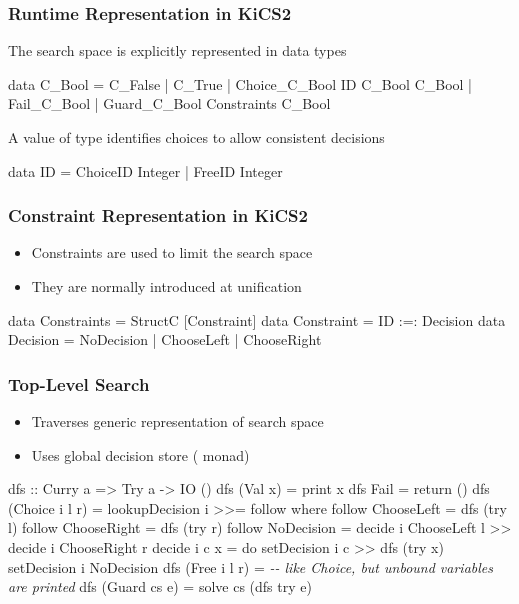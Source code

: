 \documentclass[
,hyperref={pdfpagelabels=false}
,xcolor=dvipsnames
]{beamer}
\newcommand{\comment}[1]{\textsl{-{}- #1}}
\begin{document}
\begin{frame}[fragile]%
\frametitle{Runtime Representation in KiCS2}

The search space is explicitly represented in data types
\begin{haskell}
data C_Bool
  = C_False
  | C_True
  | Choice_C_Bool ID C_Bool C_Bool
  | Fail_C_Bool
  | Guard_C_Bool Constraints C_Bool
\end{haskell}

A value of type  identifies choices to allow consistent decisions
\begin{haskell}
data ID = ChoiceID Integer
        | FreeID Integer
\end{haskell}
\end{frame}

\begin{frame}[fragile]%
\frametitle{Constraint Representation in KiCS2}

\begin{itemize}
\item Constraints are used to limit the search space
\item They are normally introduced at unification
\end{itemize}

\begin{haskell}
data Constraints = StructC [Constraint] \medskip
data Constraint = ID :=: Decision \medskip
data Decision = NoDecision
              | ChooseLeft
              | ChooseRight
\end{haskell}
\end{frame}

\begin{frame}[fragile]%
\frametitle{Top-Level Search}

\begin{itemize}
  \item Traverses generic representation of search space
  \item Uses global decision store ( monad)
\end{itemize}

\begin{haskell}
dfs :: Curry a => Try a -> IO ()
dfs (Val x)        = print x
dfs Fail           = return ()
dfs (Choice i l r) = lookupDecision i >>= follow
  where
  follow ChooseLeft  = dfs (try l)
  follow ChooseRight = dfs (try r)
  follow NoDecision  = decide i ChooseLeft l >> decide i ChooseRight r \medskip
  decide i c x = do setDecision i c >> dfs (try x)
                    setDecision i NoDecision
dfs (Free i l r)   = \comment{like Choice, but unbound variables are printed}
dfs (Guard cs e)   = solve cs (dfs try e)
\end{haskell}
\end{frame}
\end{document}
